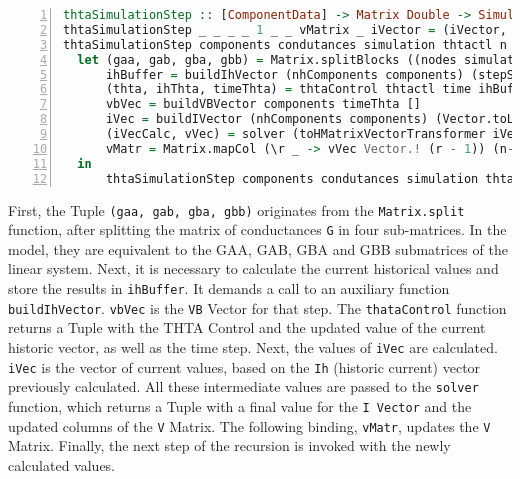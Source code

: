 \begin{lstlisting}[language=Haskell, numbers=left, caption={Building the simulation loop - let bindings}, captionpos=b, label={lst:simulloopimpl}]
thtaSimulationStep :: [ComponentData] -> Matrix Double -> SimulationData -> Int -> Int -> Double  -> Vector Double -> Matrix Double -> Vector Double -> Vector Double -> SimulationResults
thtaSimulationStep _ _ _ _ 1 _ _ vMatrix _ iVector = (iVector, vMatrix)
thtaSimulationStep components condutances simulation thtactl n time ih vMatrix vbVector iVector =
  let (gaa, gab, gba, gbb) = Matrix.splitBlocks ((nodes simulation) - (voltageSources simulation)) ((nodes simulation) - (voltageSources simulation)) condutances
      ihBuffer = buildIhVector (nhComponents components) (stepSize simulation) n (Vector.toList ih) [] vMatrix
      (thta, ihThta, timeThta) = thtaControl thtactl time ihBuffer ih simulation
      vbVec = buildVBVector components timeThta []
      iVec = buildIVector (nhComponents components) (Vector.toList ihThta) (Vector.replicate (nodes simulation) 0)
      (iVecCalc, vVec) = solver (toHMatrixVectorTransformer iVec) (toHMatrixTransformer gaa) (toHMatrixTransformer gab) (toHMatrixTransformer gba) (toHMatrixTransformer gbb) (toHMatrixVectorTransformer vbVec) simulation
      vMatr = Matrix.mapCol (\r _ -> vVec Vector.! (r - 1)) (n-1) vMatrix
  in
      thtaSimulationStep components condutances simulation thta (n-1) timeThta ihThta vMatr vbVec iVecCalc
\end{lstlisting}

First, the Tuple \lstinline!(gaa, gab, gba, gbb)!  originates from the \lstinline!Matrix.split! function, after splitting the matrix of conductances \lstinline!G! in four sub-matrices. In the model, they are equivalent to the GAA, GAB, GBA and GBB submatrices of the linear system. Next, it is necessary to calculate the current historical values and store the results in \lstinline!ihBuffer!. It demands a call to an auxiliary function \lstinline!buildIhVector!. \lstinline!vbVec! is the \lstinline!VB! Vector for that step. The \lstinline!thataControl! function returns a Tuple with the THTA Control and the updated value of the current historic vector, as well as the time step. Next,  the values of \lstinline!iVec! are calculated. \lstinline!iVec! is  the vector of current values, based on the \lstinline!Ih! (historic current) vector previously calculated. All these intermediate values are passed to the \lstinline!solver! function, which returns a Tuple with a final value for the \lstinline!I Vector! and the updated columns of the \lstinline!V! Matrix. The following binding, \lstinline!vMatr!, updates the \lstinline!V! Matrix. Finally, the next step of the recursion is invoked with the newly calculated values. 


